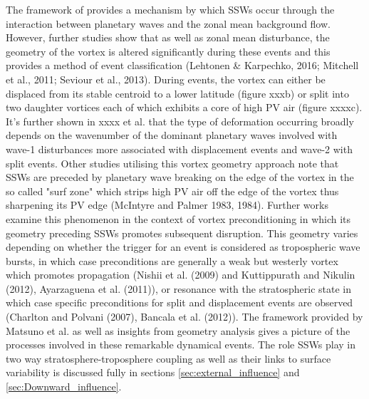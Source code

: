 {The framework of \cite{matsunoDynamical1971b} provides a mechanism by which SSWs occur through the interaction between planetary waves and the zonal mean background flow. However, further studies show that as well as zonal mean disturbance, the geometry of the vortex is altered significantly during these events and this provides a method of event classification (Lehtonen & Karpechko, 2016; Mitchell et al., 2011; Seviour et al., 2013). During events, the vortex can either be displaced from its stable centroid to a lower latitude (figure xxxb) or split into two daughter vortices each of which exhibits a core of high PV air (figure xxxxc). It's further shown in xxxx et al. that the type of deformation occurring broadly depends on the wavenumber of the dominant planetary waves involved with wave-1 disturbances more associated with displacement events and wave-2 with split events. Other studies utilising this vortex geometry approach note that SSWs are preceded by planetary wave breaking on the edge of the vortex in the so called "surf zone" which strips high PV air off the edge of the vortex thus sharpening its PV edge (McIntyre and Palmer 1983, 1984). Further works examine this phenomenon in the context of vortex preconditioning in which its geometry preceding SSWs promotes subsequent disruption. This geometry varies depending on whether the trigger for an event is considered as tropospheric wave bursts, in which case preconditions are generally a weak but westerly vortex which promotes propagation (Nishii et al. (2009) and Kuttippurath and Nikulin (2012),  Ayarzaguena et al. (2011)), or resonance with the stratospheric state in which case specific preconditions for split and displacement events are observed (Charlton and Polvani (2007), Bancala et al. (2012)). The framework provided by Matsuno et al. as well as insights from geometry analysis gives a picture of the processes involved in these remarkable dynamical events. The role SSWs play in two way stratosphere-troposphere coupling as well as their links to surface variability is discussed fully in sections \ref{sec:external_influence} and \ref{sec:Downward_influence}.

}
